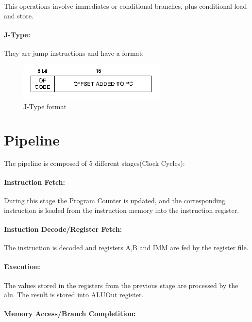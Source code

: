 This operations involve immediates or conditional branches, plus conditional load and store.\\
 
\paragraph{J-Type:}

They are jump instructions and have a format:

\begin{figure}[ht]
\centering
\includegraphics[scale = 0.9]{chapters/figures/jtype} 
\caption{J-Type format}
\label{fig:jtype}  %
\end{figure}

\section{Pipeline}

The pipeline is composed of 5 different stages(Clock Cycles):

\paragraph{Instruction Fetch:}
During this stage the Program Counter is updated, and the corresponding instruction is loaded from the instruction memory 
into the instruction register.

\paragraph{Instuction Decode/Register Fetch:}

The instruction is decoded and registers A,B and IMM are fed by the register file.
 
\paragraph{Execution:}

The values stored in the registers from the previous stage are processed by the alu.
The result is stored into ALUOut register.

\paragraph{Memory Access/Branch Completition:}

